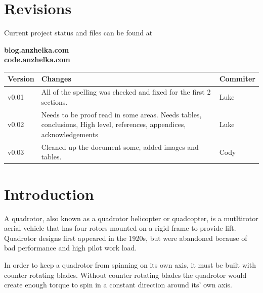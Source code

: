 \documentclass{article}
\numberwithin{equation}{section} %
\begin{document}
\section*{Revisions}
Current project status and files can be found at
\begin{center}
\bigskip \textbf{blog.anzhelka.com} \\
 \textbf{code.anzhelka.com} \\
 \bigskip
\end{center}

\begin{longtable}{l | p{5cm} | l}
\hline
\textbf{Version} & \textbf{Changes} & \textbf{Commiter}\\
\hline
v0.01 & All of the spelling was checked and fixed for the first 2 sections. & Luke \\
\hline
v0.02 & Needs to be proof read in some areas. Needs tables, conclusions, High level, references, appendices, acknowledgements & Luke \\
\hline
v0.03 & Cleaned up the document some, added images and tables. & Cody \\
\hline
\end{longtable}


\newpage
\renewcommand{\contentsname}{Table of Contents}
\tableofcontents
{}
\newpage



\section{Introduction}

A quadrotor, also known as a quadrotor helicopter or quadcopter, is a mutltirotor aerial vehicle that has four rotors mounted on a rigid frame to provide lift. Quadrotor designs first appeared in the 1920s, but were abandoned because of bad performance and high pilot work load.

In order to keep a quadrotor from spinning on its own axis, it must be built with counter rotating blades. Without counter rotating blades the quadrotor would create enough torque to spin in a constant direction around its' own axis.
\end{document}
